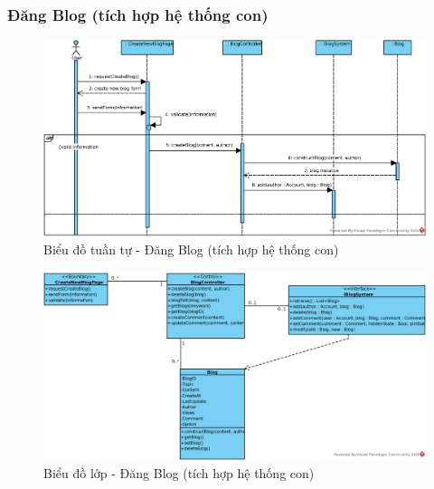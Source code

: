 \documentclass[./../main.tex]{subfiles}
\begin{document}
\subsubsection{Đăng Blog (tích hợp hệ thống con)}
\begin{figure}[H]
    \centering
    \includegraphics[width=\linewidth]{./images/UseCaseDesignDiagram/ucr_ss_create_blog.eps}
    \caption{Biểu đồ tuần tự - Đăng Blog (tích hợp hệ thống con)}
\end{figure}
\begin{figure}[H]
    \centering
    \includegraphics[width=\linewidth]{./images/UseCaseDesignDiagram/ucd_ss_blog.eps}
    \caption{Biểu đồ lớp - Đăng Blog (tích hợp hệ thống con)}
\end{figure}
\end{document}

